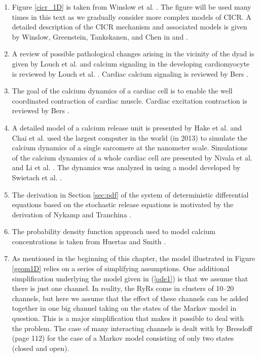 \begin{enumerate}
\item  Figure \ref{cicr_1D} is taken from Winslow et al. \cite{winslow2006}. The figure will be used many times in this text as we gradually consider more complex models of CICR. A detailed description of the CICR mechanism and associated models is given by Winslow, Greenstein, Tankskanen, and Chen in  \cite{winslow2006} and \cite{winslow2011}.
\item A review of possible pathological changes arising in the vicinity of the dyad is given by Louch et al. \cite{Louch2010} and calcium signaling in the developing  cardiomyocyte is reviewed by Louch et al. \cite{Louch2015}. Cardiac calcium signaling is reviewed by  Bers \cite{Bers2008}.
\item The goal of the calcium dynamics of a cardiac cell is to enable the well coordinated contraction of  cardiac muscle. Cardiac excitation contraction is reviewed by Bers \cite{Bers2001,Bers2002N}.
\item A detailed model of a calcium release unit is presented by Hake et al. \cite{Hake2012} and Chai et al. \cite{Chai2013} used the largest computer in the world (in 2013) to simulate the calcium dynamics of a single sarcomere at the nanometer scale. Simulations of the calcium dynamics of a whole cardiac cell are presented by Nivala et al. \cite{Nivala2012} and Li et al. \cite{Li2009,Li2010}. The dynamics was analyzed in \cite{Tveito2012} using a model developed by Swietach et al. \cite{Swietach2008}.
\item The derivation in Section \ref{sec:pdf} of the system of deterministic differential equations based on the stochastic release equations is motivated by the derivation of Nykamp and Tranchina \cite{Nykamp2000}.
\item The probability density function approach used to model calcium concentrations is taken from Huertas and Smith \cite{Huertas2007}.
\item As mentioned in the beginning of this chapter, the model illustrated in Figure \ref{geom1D} relies on a series of simplifying assumptions. One additional simplification underlying the model given in (\ref{ode1}) is that we assume that there is just one channel. In reality, the RyRs come in clusters of 10--20 channels, but here we assume that the effect of these channels can be added together in one big channel taking on the states of the Markov model in question. This is a major simplification that makes it possible to deal with the problem. The case of many interacting channels is dealt with by  Bressloff \cite{Bressloff2014} (page 112) for the case of a Markov model consisting of only two states (closed and open). 

\end{enumerate}
